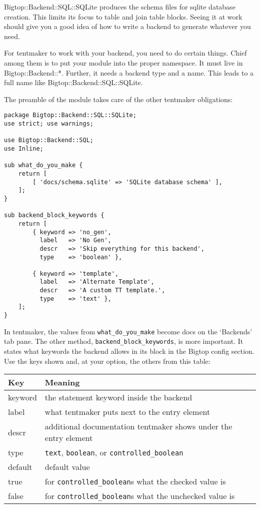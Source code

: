 Bigtop::Backend::SQL::SQLite produces the schema files for sqlite database
creation.  This limits its focus to table and join table blocks.  Seeing
it at work should give you a good idea of how to write a backend to
generate whatever you need.

For tentmaker to work with your backend, you need to do certain things.
Chief among them is to put your module into the proper namespace.  It
must live in Bigtop::Backend::*.  Further, it needs a backend type
and a name.  This leads to a full name like Bigtop::Backend::SQL::SQLite.

The preamble of the module takes care of the other tentmaker obligations:

\begin{verbatim}
package Bigtop::Backend::SQL::SQLite;
use strict; use warnings;

use Bigtop::Backend::SQL;
use Inline;

sub what_do_you_make {
    return [
        [ 'docs/schema.sqlite' => 'SQLite database schema' ],
    ];
}

sub backend_block_keywords {
    return [
        { keyword => 'no_gen',
          label   => 'No Gen',
          descr   => 'Skip everything for this backend',
          type    => 'boolean' },

        { keyword => 'template',
          label   => 'Alternate Template',
          descr   => 'A custom TT template.',
          type    => 'text' },
    ];
}
\end{verbatim}

In tentmaker, the values from \verb+what_do_you_make+ become docs on
the `Backends' tab pane.  The other method, \verb+backend_block_keywords+,
is more important.  It states what keywords the backend allows in its
block in the Bigtop config section.  Use the keys shown and, at your option,
the others from this table:

\begin{tabular}{l|l}
Key     & Meaning \\
\hline
keyword & the statement keyword inside the backend                         \\
label   & what tentmaker puts next to the entry element                    \\
descr   & additional documentation tentmaker shows under the entry element \\
type    & \verb+text+, \verb+boolean+, or \verb+controlled_boolean+        \\
default & default value                                                    \\
true    & for \verb+controlled_boolean+s what the checked value is         \\
false   & for \verb+controlled_boolean+s what the unchecked value is       \\
\end{tabular}

